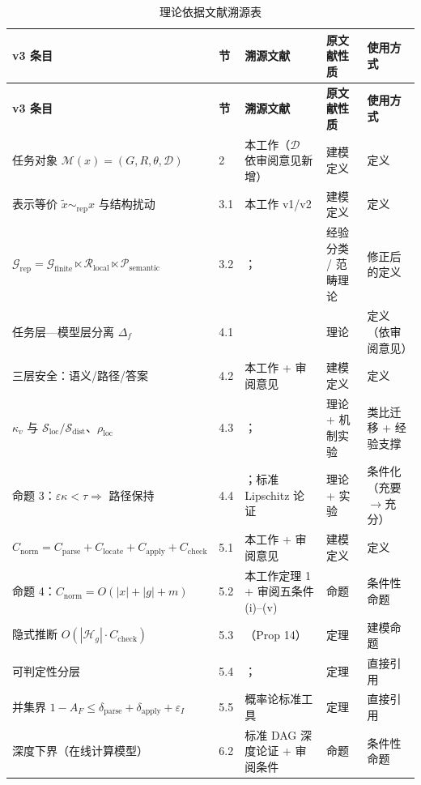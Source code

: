 \documentclass[11pt]{ctexart}
\begin{document}
\begin{small}
\setlength{\tabcolsep}{4pt}
\renewcommand{\arraystretch}{1.25}
\begin{longtable}{p{4.1cm}p{0.9cm}p{4.7cm}p{1.9cm}p{2.9cm}}
\caption{理论依据文献溯源表}\\
\toprule
\textbf{v3 条目} & \textbf{节} & \textbf{溯源文献} & \textbf{原文献性质} & \textbf{使用方式} \\
\midrule
\endfirsthead
\toprule
\textbf{v3 条目} & \textbf{节} & \textbf{溯源文献} & \textbf{原文献性质} & \textbf{使用方式} \\
\midrule
\endhead
\bottomrule
\endfoot
任务对象 $\mathcal{M}(x)=(G,R,\theta,\mathcal{D})$ & 2 & 本工作（$\mathcal{D}$ 依审阅意见新增） & 建模定义 & 定义 \\
表示等价 $\tilde{x}\sim_{\mathrm{rep}}x$ 与结构扰动 & 3.1 & 本工作 v1/v2 & 建模定义 & 定义 \\
$\mathcal{G}_{\mathrm{rep}}=\mathcal{G}_{\mathrm{finite}}\ltimes\mathcal{R}_{\mathrm{local}}\ltimes\mathcal{P}_{\mathrm{semantic}}$ & 3.2 & \cite{metamorphic}；\cite{symmetries} & 经验分类 / 范畴理论 & 修正后的定义 \\
任务层—模型层分离 $\Delta_f$ & 4.1 & \cite{symmetries} & 理论 & 定义（依审阅意见） \\
三层安全：语义/路径/答案 & 4.2 & 本工作 + 审阅意见 & 建模定义 & 定义 \\
$\kappa_v$ 与 $\mathcal{S}_{\mathrm{loc}}/\mathcal{S}_{\mathrm{dist}}$、$\rho_{\mathrm{loc}}$ & 4.3 & \cite{predictivemaps}；\cite{fragile} & 理论 + 机制实验 & 类比迁移 + 经验支撑 \\
命题 3：$\varepsilon\kappa<\tau\Rightarrow$ 路径保持 & 4.4 & \cite{quiver}；标准 Lipschitz 论证 & 理论 + 实验 & 条件化（充要$\to$充分） \\
$C_{\mathrm{norm}}=C_{\mathrm{parse}}+C_{\mathrm{locate}}+C_{\mathrm{apply}}+C_{\mathrm{check}}$ & 5.1 & 本工作 + 审阅意见 & 建模定义 & 定义 \\
命题 4：$C_{\mathrm{norm}}=O(|x|+|g|+m)$ & 5.2 & 本工作定理 1 + 审阅五条件 (i)–(v) & 命题 & 条件性命题 \\
隐式推断 $O(|\mathcal{H}_g|\cdot C_{\mathrm{check}})$ & 5.3 & \cite{symmetries}（Prop 14） & 定理 & 建模命题 \\
可判定性分层 & 5.4 & \cite{lenbound}；\cite{symmetries} & 定理 & 直接引用 \\
并集界 $1-A_F\le\delta_{\mathrm{parse}}+\delta_{\mathrm{apply}}+\varepsilon_I$ & 5.5 & 概率论标准工具 & 定理 & 直接引用 \\
深度下界（在线计算模型） & 6.2 & 标准 DAG 深度论证 + 审阅条件 & 命题 & 条件性命题 \\

\end{longtable}
\end{small}
\end{document}
